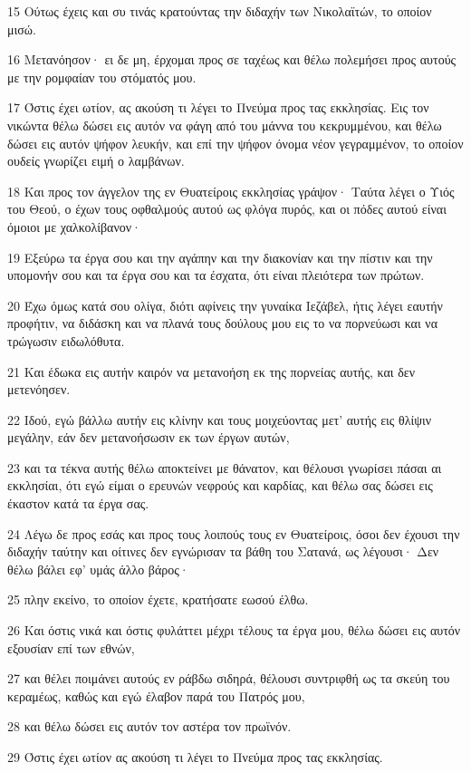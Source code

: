 \par 15 Ούτως έχεις και συ τινάς κρατούντας την διδαχήν των Νικολαϊτών, το οποίον μισώ.
\par 16 Μετανόησον· ει δε μη, έρχομαι προς σε ταχέως και θέλω πολεμήσει προς αυτούς με την ρομφαίαν του στόματός μου.
\par 17 Όστις έχει ωτίον, ας ακούση τι λέγει το Πνεύμα προς τας εκκλησίας. Εις τον νικώντα θέλω δώσει εις αυτόν να φάγη από του μάννα του κεκρυμμένου, και θέλω δώσει εις αυτόν ψήφον λευκήν, και επί την ψήφον όνομα νέον γεγραμμένον, το οποίον ουδείς γνωρίζει ειμή ο λαμβάνων.
\par 18 Και προς τον άγγελον της εν Θυατείροις εκκλησίας γράψον· Ταύτα λέγει ο Υιός του Θεού, ο έχων τους οφθαλμούς αυτού ως φλόγα πυρός, και οι πόδες αυτού είναι όμοιοι με χαλκολίβανον·
\par 19 Εξεύρω τα έργα σου και την αγάπην και την διακονίαν και την πίστιν και την υπομονήν σου και τα έργα σου και τα έσχατα, ότι είναι πλειότερα των πρώτων.
\par 20 Έχω όμως κατά σου ολίγα, διότι αφίνεις την γυναίκα Ιεζάβελ, ήτις λέγει εαυτήν προφήτιν, να διδάσκη και να πλανά τους δούλους μου εις το να πορνεύωσι και να τρώγωσιν ειδωλόθυτα.
\par 21 Και έδωκα εις αυτήν καιρόν να μετανοήση εκ της πορνείας αυτής, και δεν μετενόησεν.
\par 22 Ιδού, εγώ βάλλω αυτήν εις κλίνην και τους μοιχεύοντας μετ' αυτής εις θλίψιν μεγάλην, εάν δεν μετανοήσωσιν εκ των έργων αυτών,
\par 23 και τα τέκνα αυτής θέλω αποκτείνει με θάνατον, και θέλουσι γνωρίσει πάσαι αι εκκλησίαι, ότι εγώ είμαι ο ερευνών νεφρούς και καρδίας, και θέλω σας δώσει εις έκαστον κατά τα έργα σας.
\par 24 Λέγω δε προς εσάς και προς τους λοιπούς τους εν Θυατείροις, όσοι δεν έχουσι την διδαχήν ταύτην και οίτινες δεν εγνώρισαν τα βάθη του Σατανά, ως λέγουσι· Δεν θέλω βάλει εφ' υμάς άλλο βάρος·
\par 25 πλην εκείνο, το οποίον έχετε, κρατήσατε εωσού έλθω.
\par 26 Και όστις νικά και όστις φυλάττει μέχρι τέλους τα έργα μου, θέλω δώσει εις αυτόν εξουσίαν επί των εθνών,
\par 27 και θέλει ποιμάνει αυτούς εν ράβδω σιδηρά, θέλουσι συντριφθή ως τα σκεύη του κεραμέως, καθώς και εγώ έλαβον παρά του Πατρός μου,
\par 28 και θέλω δώσει εις αυτόν τον αστέρα τον πρωϊνόν.
\par 29 Όστις έχει ωτίον ας ακούση τι λέγει το Πνεύμα προς τας εκκλησίας.


